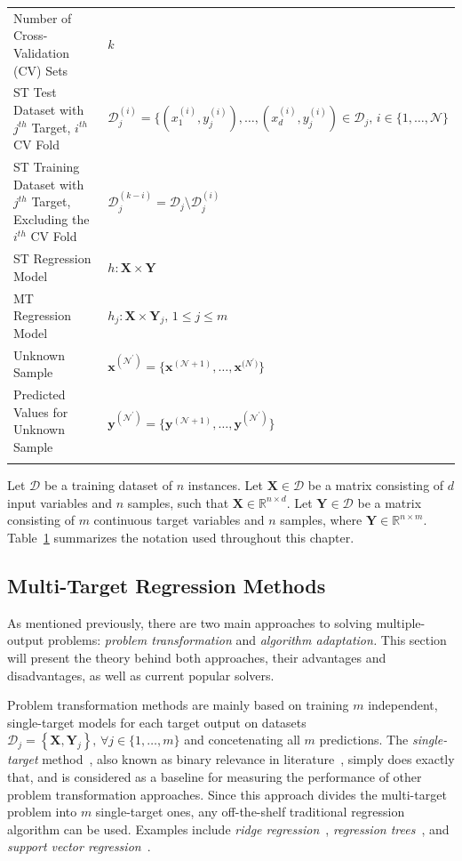 \documentclass[reqno]{vcuthesis}
\newcommand{\set}[1]{{\left\{#1\right\}}}
\numberwithin{equation}{chapter}
\begin{document}
\begin{table}[t!]
{\begin{tabular}{ll}
Number of Cross-Validation (CV) Sets & $k$ \\
ST Test Dataset with $j^{th}$ Target, $i^{th}$ CV Fold & $\mathcal{D}_j^{(i)} = \{(x_1^{(i)},y_j^{(i)}), \ldots, (x_d^{(i)},y_j^{(i)}) \in \mathcal{D}_j,\, i \in \{1,\ldots,\mathcal{N}\}$ \\
ST Training Dataset with $j^{th}$ Target, Excluding the $i^{th}$ CV Fold & $\mathcal{D}_j^{(k-i)} = \mathcal{D}_j \setminus \mathcal{D}_j^{(i)}$ \\
ST Regression Model & $h : \bm{X} \times \bm{Y}$ \\
MT Regression Model & $h_j : \bm{X} \times \bm{Y}_j,\, 1 \leq j \leq m$ \\
Unknown Sample & $\bm{x}^{(\mathcal N^\prime)} = \{\bm {x}^{(\mathcal N+1)}, \ldots, \bm {x}^{\mathcal (N^\prime)}\}$ \\
Predicted Values for Unknown Sample & $\bm{y}^{(\mathcal N^\prime)} = \{\bm{y}^{(\mathcal N+1)}, \ldots, \bm {y}^{(\mathcal N^\prime)}\}$\\
\noalign{\smallskip}\hline\noalign{\smallskip}
\end{tabular}}
\label{tab:mtrNotation}
\end{table}
Let $\mathcal{D}$ be a training dataset of $n$ instances. Let $\bm{X} \in \mathcal{D}$ be a matrix consisting of $d$ input variables and $n$ samples, such that $\bm{X} \in \mathbb{R}^{n \times d}$. Let $\bm{Y} \in \mathcal{D}$ be a matrix consisting of $m$ continuous target variables and $n$ samples,  where $\bm{Y} \in \mathbb{R}^{n \times m}$. Table~\ref{tab:mtrNotation} summarizes the notation used throughout this chapter.

\subsection{Multi-Target Regression Methods}
As mentioned previously, there are two main approaches to solving multiple-output problems: \textit{problem transformation} and \textit{algorithm adaptation.} This section will present the theory behind both approaches, their advantages and disadvantages, as well as current popular solvers.

Problem transformation methods are mainly based on training $m$ independent, single-target models for each target output on datasets $\mathcal{D}_j = \set{\bm X, \bm Y_j},\, \forall j \in \{1, \ldots, m\}$ and concetenating all $m$ predictions. The \textit{single-target} method~\cite{Spyromitros2014}, also known as binary relevance in literature~\cite{Zhang20141819}, simply does exactly that, and is considered as a baseline for measuring the performance of other problem transformation approaches. Since this approach divides the multi-target problem into $m$ single-target ones, any off-the-shelf traditional regression algorithm can be used. Examples include \textit{ridge regression}~\cite{hoerl1970ridge}, \textit{regression trees}~\cite{Breiman1996}, and \textit{support vector regression}~\cite{Drucker1997}.
\end{document}
